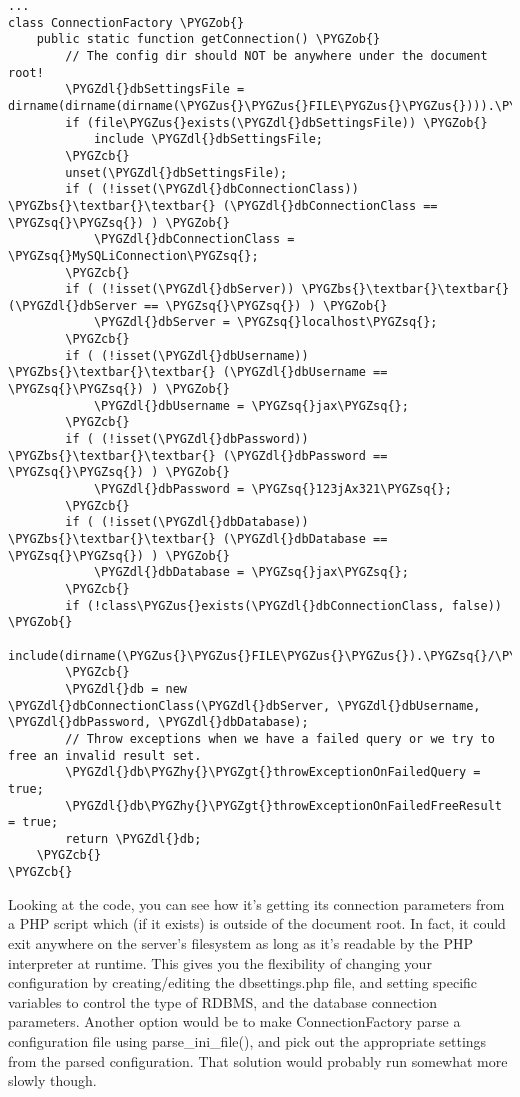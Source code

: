 \documentclass[letterpaper,10pt,english]{sphinxmanual}
\def\PYGZbs{\char`\\}
\def\PYGZus{\char`\_}
\def\PYGZob{\char`\{}
\def\PYGZcb{\char`\}}
\def\PYGZgt{\char`\>}
\def\PYGZdl{\char`\$}
\def\PYGZhy{\char`\-}
\def\PYGZsq{\char`\'}
\renewcommand\PYGZsq{\textquotesingle}
\begin{document}
\begin{Verbatim}[commandchars=\\\{\}]
...
class ConnectionFactory \PYGZob{}
    public static function getConnection() \PYGZob{}
        // The config dir should NOT be anywhere under the document root!
        \PYGZdl{}dbSettingsFile = dirname(dirname(dirname(\PYGZus{}\PYGZus{}FILE\PYGZus{}\PYGZus{}))).\PYGZsq{}/config/dbsettings.php\PYGZsq{};
        if (file\PYGZus{}exists(\PYGZdl{}dbSettingsFile)) \PYGZob{}
            include \PYGZdl{}dbSettingsFile;
        \PYGZcb{}
        unset(\PYGZdl{}dbSettingsFile);
        if ( (!isset(\PYGZdl{}dbConnectionClass)) \PYGZbs{}\textbar{}\textbar{} (\PYGZdl{}dbConnectionClass == \PYGZsq{}\PYGZsq{}) ) \PYGZob{}
            \PYGZdl{}dbConnectionClass = \PYGZsq{}MySQLiConnection\PYGZsq{};
        \PYGZcb{}
        if ( (!isset(\PYGZdl{}dbServer)) \PYGZbs{}\textbar{}\textbar{} (\PYGZdl{}dbServer == \PYGZsq{}\PYGZsq{}) ) \PYGZob{}
            \PYGZdl{}dbServer = \PYGZsq{}localhost\PYGZsq{};
        \PYGZcb{}
        if ( (!isset(\PYGZdl{}dbUsername)) \PYGZbs{}\textbar{}\textbar{} (\PYGZdl{}dbUsername == \PYGZsq{}\PYGZsq{}) ) \PYGZob{}
            \PYGZdl{}dbUsername = \PYGZsq{}jax\PYGZsq{};
        \PYGZcb{}
        if ( (!isset(\PYGZdl{}dbPassword)) \PYGZbs{}\textbar{}\textbar{} (\PYGZdl{}dbPassword == \PYGZsq{}\PYGZsq{}) ) \PYGZob{}
            \PYGZdl{}dbPassword = \PYGZsq{}123jAx321\PYGZsq{};
        \PYGZcb{}
        if ( (!isset(\PYGZdl{}dbDatabase)) \PYGZbs{}\textbar{}\textbar{} (\PYGZdl{}dbDatabase == \PYGZsq{}\PYGZsq{}) ) \PYGZob{}
            \PYGZdl{}dbDatabase = \PYGZsq{}jax\PYGZsq{};
        \PYGZcb{}
        if (!class\PYGZus{}exists(\PYGZdl{}dbConnectionClass, false)) \PYGZob{}
            include(dirname(\PYGZus{}\PYGZus{}FILE\PYGZus{}\PYGZus{}).\PYGZsq{}/\PYGZsq{}.\PYGZdl{}dbConnectionClass.\PYGZsq{}.class.php\PYGZsq{});
        \PYGZcb{}
        \PYGZdl{}db = new \PYGZdl{}dbConnectionClass(\PYGZdl{}dbServer, \PYGZdl{}dbUsername, \PYGZdl{}dbPassword, \PYGZdl{}dbDatabase);
        // Throw exceptions when we have a failed query or we try to free an invalid result set.
        \PYGZdl{}db\PYGZhy{}\PYGZgt{}throwExceptionOnFailedQuery = true;
        \PYGZdl{}db\PYGZhy{}\PYGZgt{}throwExceptionOnFailedFreeResult = true;
        return \PYGZdl{}db;
    \PYGZcb{}
\PYGZcb{}
\end{Verbatim}

Looking at the code, you can see how it's getting its connection parameters from a PHP script which
(if it exists) is outside of the document root.  In fact, it could exit anywhere on the server's
filesystem as long as it's readable by the PHP interpreter at runtime.  This gives you the
flexibility of changing your configuration by creating/editing the dbsettings.php file, and setting
specific variables to control the type of RDBMS, and the database connection parameters.  Another
option would be to make ConnectionFactory parse a configuration file using parse\_ini\_file(), and
pick out the appropriate settings from the parsed configuration.  That solution would probably run
somewhat more slowly though.
\end{document}
